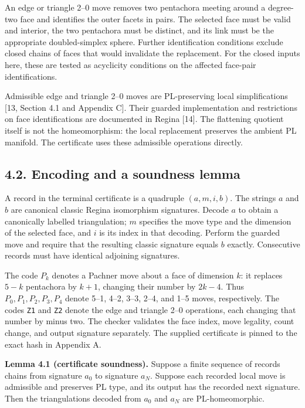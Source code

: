 \documentclass[11pt,letterpaper]{article}
\begin{document}
An edge or triangle 2--0 move removes two pentachora meeting around a degree-two face and identifies the outer facets in pairs. The selected face must be valid and interior, the two pentachora must be distinct, and its link must be the appropriate doubled-simplex sphere. Further identification conditions exclude closed chains of faces that would invalidate the replacement. For the closed inputs here, these are tested as acyclicity conditions on the affected face-pair identifications.

Admissible edge and triangle 2--0 moves are PL-preserving local simplifications [13, Section 4.1 and Appendix C]. Their guarded implementation and restrictions on face identifications are documented in Regina [14]. The flattening quotient itself is not the homeomorphism: the local replacement preserves the ambient PL manifold. The certificate uses these admissible operations directly.

\subsection*{4.2. Encoding and a soundness lemma}
A record in the terminal certificate is a quadruple $(a,m,i,b)$. The strings $a$ and $b$ are canonical classic Regina isomorphism signatures. Decode $a$ to obtain a canonically labelled triangulation; $m$ specifies the move type and the dimension of the selected face, and $i$ is its index in that decoding. Perform the guarded move and require that the resulting classic signature equals $b$ exactly. Consecutive records must have identical adjoining signatures.

The code $P_k$ denotes a Pachner move about a face of dimension $k$: it replaces $5-k$ pentachora by $k+1$, changing their number by $2k-4$. Thus $P_0,P_1,P_2,P_3,P_4$ denote 5--1, 4--2, 3--3, 2--4, and 1--5 moves, respectively. The codes {\small\texttt{Z1}} and {\small\texttt{Z2}} denote the edge and triangle 2--0 operations, each changing that number by minus two. The checker validates the face index, move legality, count change, and output signature separately. The supplied certificate is pinned to the exact hash in Appendix A.

\medskip\noindent\textbf{Lemma 4.1 (certificate soundness).} Suppose a finite sequence of records chains from signature $a_0$ to signature $a_N$. Suppose each recorded local move is admissible and preserves PL type, and its output has the recorded next signature. Then the triangulations decoded from $a_0$ and $a_N$ are PL-homeomorphic.
\end{document}
